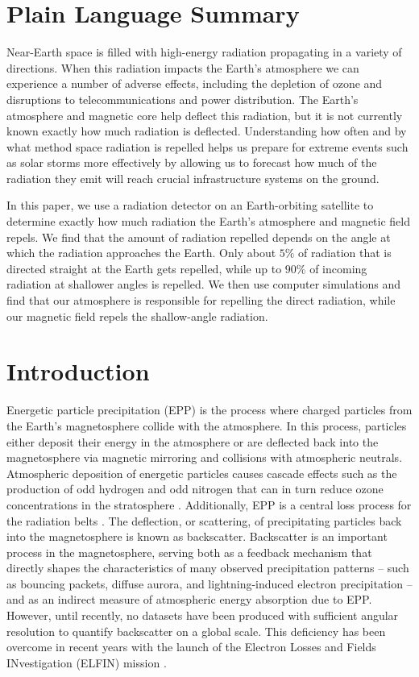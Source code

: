 \documentclass[draft]{agujournal2019}
\begin{document}
\section*{Plain Language Summary}
Near-Earth space is filled with high-energy radiation propagating in a variety of directions. When this radiation impacts the Earth's atmosphere we can experience a number of adverse effects, including the depletion of ozone and disruptions to telecommunications and power distribution. The Earth's atmosphere and magnetic core help deflect this radiation, but it is not currently known exactly how much radiation is deflected. Understanding how often and by what method space radiation is repelled helps us prepare for extreme events such as solar storms more effectively by allowing us to forecast how much of the radiation they emit will reach crucial infrastructure systems on the ground.

In this paper, we use a radiation detector on an Earth-orbiting satellite to determine exactly how much radiation the Earth's atmosphere and magnetic field repels. We find that the amount of radiation repelled depends on the angle at which the radiation approaches the Earth. Only about $5\%$ of radiation that is directed straight at the Earth gets repelled, while up to $90\%$ of incoming radiation at shallower angles is repelled. We then use computer simulations and find that our atmosphere is responsible for repelling the direct radiation, while our magnetic field repels the shallow-angle radiation.

\section{Introduction}
Energetic particle precipitation (EPP) is the process where charged particles from the Earth's magnetosphere collide with the atmosphere. In this process, particles either deposit their energy in the atmosphere or are deflected back into the magnetosphere via magnetic mirroring and collisions with atmospheric neutrals. Atmospheric deposition of energetic particles causes cascade effects such as the production of odd hydrogen and odd nitrogen that can in turn reduce ozone concentrations in the stratosphere \cite{randall2005, seppalla2007, sinnhuber2012, funke2014, koskinen-beltbook}. Additionally, EPP is a central loss process for the radiation belts \cite{ripoll2020, millan2007}. The deflection, or scattering, of precipitating particles back into the magnetosphere is known as backscatter. Backscatter is an important process in the magnetosphere, serving both as a feedback mechanism that directly shapes the characteristics of many observed precipitation patterns -- such as bouncing packets, diffuse aurora, and lightning-induced electron precipitation \cite{feinland2024, wetzel2024, khazanov2021, cotts2011, davidson1977} -- and as an indirect measure of atmospheric energy absorption due to EPP. However, until recently, no datasets have been produced with sufficient angular resolution to quantify backscatter on a global scale. This deficiency has been overcome in recent years with the launch of the Electron Losses and Fields INvestigation (ELFIN) mission \cite{angelopoulos2020}.
\end{document}
